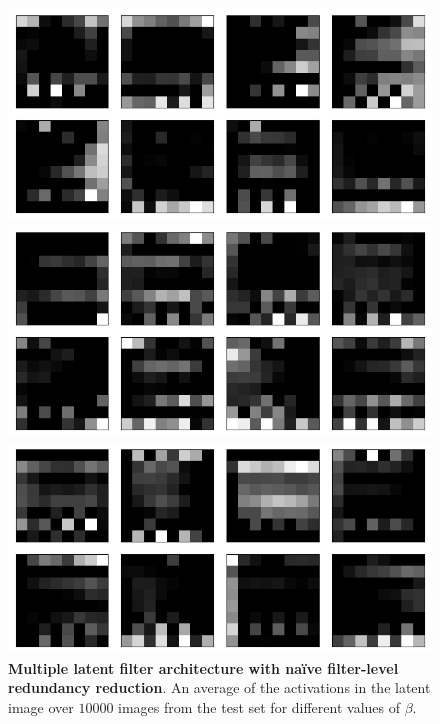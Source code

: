 \begin{figure}[h!]
\centering
\captionsetup{justification=centering}

    \includegraphics[scale=0.3]{figures/results/naive_average/beta_1_average_activation.png}
    \caption{$\beta=1$}
    \includegraphics[scale=0.3]{figures/results/naive_average/beta_4_average_activation.png}
    \caption{$\beta=4$}
    \includegraphics[scale=0.42]{figures/results/naive_average/beta_32_average_activation.png}
    \caption{$\beta=32$}

\caption{\textbf{Multiple latent filter architecture with na{\"i}ve filter-level redundancy reduction}. An average of the activations in the latent image over $10000$ images from the test set for different values of $\beta$.}
\label{fig:naive_average_average_filters}
\end{figure}




